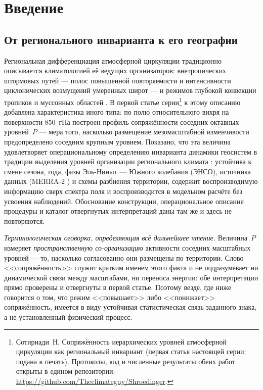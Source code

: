 \documentclass[11pt,a4paper]{article}
\begin{document}
\section{Введение}
\label{sec:intro}

\subsection{От регионального инварианта к его географии}

Региональная дифференциация атмосферной циркуляции традиционно описывается климатологией её ведущих организаторов: внетропических штормовых путей --- полос повышенной повторяемости и интенсивности циклонических возмущений умеренных широт \cite{HoskinsValdes1990,Chang2002,HoskinsHodges2005,Shaw2016} --- и режимов глубокой конвекции тропиков и муссонных областей \cite{Houze2004,Feng2021}. В первой статье серии\footnote{Сотириади~Н. Сопряжённость иерархических уровней атмосферной циркуляции как региональный инвариант (первая статья настоящей серии; подана в печать). Протоколы, код и численные результаты обеих работ открыты в едином репозитории: \url{https://github.com/Theclimateguy/Shroedinger}.} к этому описанию добавлена характеристика иного типа: по полю относительного вихря на поверхности 850~гПа построен профиль сопряжённости соседних октавных уровней~$P$ --- мера того, насколько размещение мезомасштабной изменчивости предопределено соседним крупным уровнем. Показано, что эта величина удовлетворяет операциональному определению инварианта динамики геосистем \cite{Puzachenko1986,Puzachenko2004,Puzachenko2010} в традиции выделения уровней организации регионального климата \cite{Krenke2019}: устойчива к смене сезона, года, фазы Эль-Ниньо~--- Южного колебания (ЭНСО), источника данных (MERRA-2 \cite{Gelaro2017}) и схемы разбиения территории, содержит воспроизводимую информацию сверх спектра поля и воспроизводится в модельном расчёте без усвоения наблюдений. Обоснование конструкции, операциональное описание процедуры и каталог отвергнутых интерпретаций даны там же и здесь не повторяются.

\emph{Терминологическая оговорка, определяющая всё дальнейшее чтение.} Величина~$P$ измеряет \emph{пространственную со-организацию} активности соседних масштабных уровней --- то, насколько согласованно они размещены по территории. Слово <<сопряжённость>> служит кратким именем этого факта и не подразумевает ни динамической связи между масштабами, ни переноса энергии: обе интерпретации прямо проверены и отвергнуты в первой статье. Поэтому везде, где ниже говорится о том, что режим <<повышает>> либо <<понижает>> сопряжённость, имеется в виду устойчивая статистическая связь заданного знака, а не установленный физический процесс.
\end{document}
